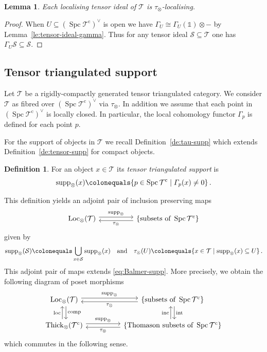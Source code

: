 \documentclass{amsart}[a4]
\newtheorem{lemma}[theorem]{Lemma}
\theoremstyle{definition}
\newtheorem{definition}[theorem]{Definition}
\theoremstyle{remark}
\numberwithin{equation}{section}
\newcommand{\comp}{\operatorname{comp}}
\newcommand{\inc}{\operatorname{inc}}
\newcommand{\loc}{\operatorname{loc}}
\newcommand{\Loc}{\operatorname{Loc}}
\newcommand{\Spc}{\operatorname{Spc}}
\newcommand{\supp}{\operatorname{supp}}
\newcommand{\Thick}{\operatorname{Thick}}
\newcommand{\cat}{\mathcal}
\newcommand{\one}{\mathds 1}
\let\Gamma\varGamma
\begin{document}
\begin{lemma}\label{le:tensor-tau-local}
  Each localising tensor ideal of $\cat T$ is $\tau_\otimes$-localising.
\end{lemma}
\begin{proof}
  When $U\subseteq(\Spc\cat T^{\mathrm c})^\vee$ is open we have
  $\Gamma_U\cong\Gamma_U(\one)\otimes -$ by
  Lemma~\ref{le:tensor-ideal-gamma}. Thus for any tensor ideal
  $\cat S\subseteq\cat T$ one has $\Gamma_U\cat S\subseteq\cat S$.
\end{proof}

\subsection*{Tensor triangulated support}

Let $\cat T$ be a rigidly-compactly generated tensor triangulated
category. We consider $\cat T$ as fibred over $(\Spc\cat T^{\mathrm c})^\vee$
via $\tau_\otimes$. In addition we assume that each point in
$(\Spc\cat T^{\mathrm c})^\vee$ is locally closed. In particular, the local
cohomology functor $\Gamma_p$ is defined for each point $p$.

For the support of objects in $\cat T$ we recall
Definition~\ref{de:tau-supp} which extends
Definition~\ref{de:tensor-supp} for compact objects.

\begin{definition}
For an object $x\in\cat T$ its \emph{tensor triangulated support} is
  \[\supp_\otimes(x)\colonequals\{p\in \Spc\cat T^{\mathrm c}\mid\Gamma_p(x)\neq
    0\}\,.\]
\end{definition}

This definition yields an adjoint pair of inclusion preserving maps  
\begin{equation*}
\begin{tikzcd}
\Loc_\otimes(\cat T) \ar[rr,yshift=2.5,"\supp_\otimes"] &&  \ar[ll,yshift=-2.5,"\tau_\otimes"]
\{\text{subsets of }\Spc\cat T^{\mathrm c}\}
\end{tikzcd}
\end{equation*}
given by
\[
\supp_\otimes(\cat S)\colonequals\bigcup_{x\in\cat S}\supp_\otimes(x)\quad\text{and}\quad
  \tau_\otimes(U)\colonequals\{x\in\cat T\mid\supp_\otimes(x)\subseteq U\}\,.
\]
This adjoint pair of maps extends \eqref{eq:Balmer-supp}.  More
precisely, we obtain the following  diagram of poset
morphisms
\begin{equation}\label{eq:tensor-supp-square} 
\begin{tikzcd}
\Loc_\otimes(\cat T) \ar[rr,yshift=2.5,"\supp_\otimes"] \ar[d,xshift=2.5,"\comp"] &&
\ar[ll,yshift=-2.5,"\tau_\otimes"]\{\text{subsets of }\Spc\cat T^{\mathrm c}\}\ar[d,xshift=2.5,"\mathrm{int}"]\\
\Thick_\otimes(\cat T^{\mathrm c}) \ar[u,xshift=-2.5,"\loc"] \ar[rr,yshift=2.5,"\supp_\otimes"]&&
\ar[ll,yshift=-2.5,"\tau_\otimes"]\ar[u,xshift=-2.5,"\inc"]\{\text{Thomason subsets of }\Spc\cat T^{\mathrm c}\}
\end{tikzcd}
\end{equation}
which commutes in the following sense.
\end{document}
